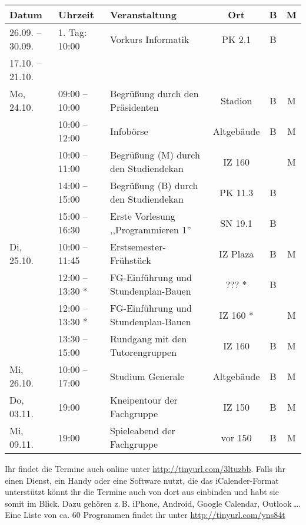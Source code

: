 	\begin{tabular}{|l|l|p{6.7cm}|c|c|c|}
	\hline \textbf{Datum} 		& \textbf{Uhrzeit} 	& \textbf{Veranstaltung}						& \textbf{Ort} 	& \textbf{B}	& \textbf{M} 	\\
	\hline 26.09. – 30.09.		& 1. Tag: 10:00	 	& Vorkurs Informatik							& PK 2.1		& B				& 				\\
		   17.10. – 21.10.		& 					& 												& 				& 				&    			\\
	\hline Mo, 24.10. 			& 09:00 – 10:00		& Begrüßung	durch den Präsidenten				& Stadion		& B				& M				\\ 
	\hline 						& 10:00 – 12:00	 	& Infobörse										& Altgebäude	& B				& M				\\
	\hline   					& 10:00 – 11:00	 	& Begrüßung (M) \newline durch den Studiendekan	& IZ 160		& 				& M				\\
	\hline 						& 14:00 – 15:00	 	& Begrüßung (B) \newline durch den Studiendekan	& PK 11.3		& B				& 				\\
	\hline 						& 15:00 – 16:30		& Erste Vorlesung ,,Programmieren 1''			& SN 19.1		& B 			&				\\
	\hline Di, 25.10.			& 10:00 – 11:45 	& Erstsemester-Frühstück 						& IZ Plaza 		& B 			& M 			\\ 
	\hline 						& 12:00 – 13:30 * 	& FG-Einführung und \newline Stundenplan-Bauen 	& ??? * 		& B 			&  				\\%
	\hline 						& 12:00 – 13:30 * 	& FG-Einführung und \newline Stundenplan-Bauen 	& IZ 160 * 		& 				& M				\\
	\hline 						& 13:30 – 15:00 	& Rundgang mit den  Tutorengruppen 				& IZ 160 		& B 			& M				\\
	\hline Mi, 26.10.			& 10:00 – 17:00		& Studium Generale								& Altgebäude	& B				& M 			\\
	\hline Do, 03.11. 			& 19:00 			& Kneipentour der Fachgruppe 					& IZ 150 		& B 			& M				\\
	\hline Mi, 09.11.	 		& 19:00 			& Spieleabend der Fachgruppe 					& vor  150 		& B 			& M				\\
	\hline
	\end{tabular} 

	\begin{multicols}{2}
	Ihr findet die Termine auch online unter \url{http://tinyurl.com/3ltuzbb}.
	Falls ihr einen Dienst, ein Handy oder eine Software nutzt, die das iCalender-Format unterstützt
	könnt ihr die Termine auch von dort aus einbinden und habt sie somit im Blick. 
	Dazu gehören z.\,B. iPhone, Android, Google Calendar, Outlook\,\dots. Eine Liste 
	von ca. 60 Programmen findet ihr unter 
	\url{http://tinyurl.com/yns84t}
	\end{multicols}
